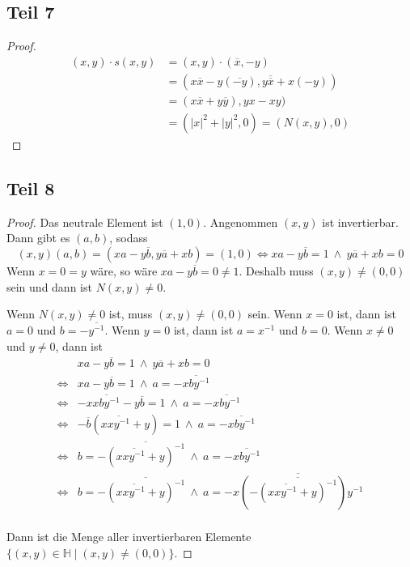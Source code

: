 \documentclass[10pt,a4paper]{article}
\begin{document}
\subsection*{Teil 7}

\begin{proof}
\begin{align*}
(x, y) \cdot s(x, y) & = (x, y) \cdot (\overline{x}, -y)\\
& = (x\overline{x} - y(\overline{-y}), y\overline{\overline{x}} + x(-y))\\
& = (x\overline{x} + y\overline{y}), yx - xy)\\
& = (|x|^{2} + |y|^{2}, 0) = (N(x, y), 0)
\end{align*}
\end{proof}

\subsection*{Teil 8}

\begin{proof}
Das neutrale Element ist $(1, 0)$.
Angenommen $(x, y)$ ist invertierbar.
Dann gibt es $(a, b)$, sodass
\begin{equation}
(x, y)(a, b) = (xa - y\overline{b}, y\overline{a} + xb) = (1, 0) \Leftrightarrow xa - y\overline{b} = 1\ \land\ y\overline{a} + xb = 0
\end{equation}
Wenn $x = 0 = y$ wäre, so wäre $xa - y\overline{b} = 0 \ne 1$.
Deshalb muss $(x, y) \ne (0, 0)$ sein und dann ist $N(x, y) \ne 0$.

Wenn $N(x, y) \ne 0$ ist, muss $(x, y) \ne (0, 0)$ sein.
Wenn $x = 0$ ist, dann ist $a = 0$ und $b = -\overline{y^{-1}}$.
Wenn $y = 0$ ist, dann ist $a = x^{-1}$ und $b = 0$.
Wenn $x \ne 0$ und $y \ne 0$, dann ist
\begin{align*}
& xa - y\overline{b} = 1\ \land\ y\overline{a} + xb = 0\\
\Leftrightarrow & xa - y\overline{b} = 1\ \land\ a = -\overline{xby^{-1}}\\
\Leftrightarrow & -x\overline{xby^{-1}} - y\overline{b} = 1\ \land\ a = -\overline{xby^{-1}}\\
\Leftrightarrow & -\overline{b}(x\overline{xy^{-1}} + y) = 1\ \land\ a = -\overline{xby^{-1}}\\
\Leftrightarrow & b = -\overline{(x\overline{xy^{-1}} + y)^{-1}}\ \land\ a = -\overline{xby^{-1}}\\
\Leftrightarrow & b = -\overline{(x\overline{xy^{-1}} + y)^{-1}}\ \land\ a = -\overline{x(-\overline{(x\overline{xy^{-1}} + y)^{-1}})y^{-1}}\\
\end{align*}

Dann ist die Menge aller invertierbaren Elemente $\{ (x, y) \in \mathbb{H} \mid (x, y) \ne (0, 0) \}$.
\end{proof}
\end{document}
